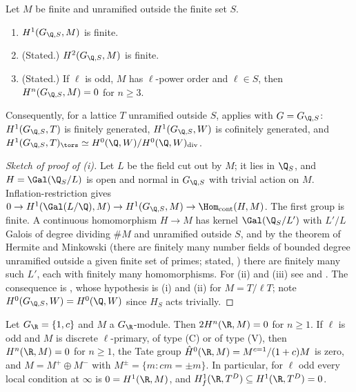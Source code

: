 \begin{theorem}\label{thm:galcoh:gqs-finite}
Let $M$ be finite and unramified outside the finite set $S$.
\begin{enumerate}[label=(\roman*)]
\item $H^1(G_{\Q,S},M)$ is finite.
\item (Stated.) $H^2(G_{\Q,S},M)$ is finite.
\item (Stated.) If $\ell$ is odd, $M$ has $\ell$-power order and $\ell\in S$, then $H^n(G_{\Q,S},M)=0$ for $n\ge3$.
\end{enumerate}
Consequently, for a lattice $T$ unramified outside $S$,  applies with $G=G_{\Q,S}$: $H^1(G_{\Q,S},T)$ is finitely generated, $H^1(G_{\Q,S},W)$ is
cofinitely generated, and $H^1(G_{\Q,S},T)_{\tors}\simeq H^0(\Q,W)/H^0(\Q,W)_{\mathrm{div}}$.
\end{theorem}

\begin{proof}[Sketch of proof of (i)]
Let $L$ be the field cut out by $M$; it lies in $\Q_S$, and $H=\Gal(\Q_S/L)$ is open and normal in $G_{\Q,S}$ with trivial action on $M$. Inflation-restriction gives
$0\to H^1(\Gal(L/\Q),M)\to H^1(G_{\Q,S},M)\to\Hom_{\mathrm{cont}}(H,M)$. The first group is finite. A continuous homomorphism $H\to M$ has kernel $\Gal(\Q_S/L')$ with $L'/L$
Galois of degree dividing $\#M$ and unramified outside $S$, and by the theorem of Hermite and Minkowski (there are finitely many number fields of bounded degree
unramified outside a given finite set of primes; stated, \cite[Chapter VIII, Section 1]{SilvermanAEC}) there are finitely many such $L'$, each with finitely many
homomorphisms. For (ii) and (iii) see \cite[Chapter VIII, Section 3]{NSW} and \cite[Chapter I, Section 4]{MilneADT}. The consequence is , whose
hypothesis is (i) and (ii) for $M=T/\ell T$; note $H^0(G_{\Q,S},W)=H^0(\Q,W)$ since $H_S$ acts trivially.
\end{proof}

\begin{proposition}\label{prop:galcoh:real-place}
Let $G_\R=\{1,c\}$ and $M$ a $G_\R$-module. Then $2H^n(\R,M)=0$ for $n\ge1$. If $\ell$ is odd and $M$ is discrete $\ell$-primary, of type (C) or of type (V), then
$H^n(\R,M)=0$ for $n\ge1$, the Tate group $\hat H^0(\R,M)=M^{c=1}/(1+c)M$ is zero, and $M=M^+\oplus M^-$ with $M^\pm=\{m:cm=\pm m\}$. In particular, for $\ell$ odd every
local condition at $\infty$ is $0=H^1(\R,M)$, and $H^1_f(\R,T^D)\subseteq H^1(\R,T^D)=0$.
\end{proposition}

